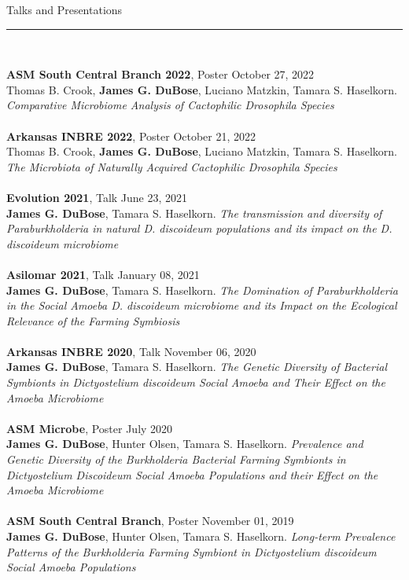\documentclass{article}
\begin{document}
\begin{flushleft}
{\Large Talks and Presentations} \rule{16.51cm}{0.4pt}\\
\end{flushleft}
\textbf{ASM South Central Branch 2022}, Poster \hfill October 27, 2022\\
Thomas B. Crook, \textbf{James G. DuBose}, Luciano Matzkin, Tamara S. Haselkorn. \emph{Comparative Microbiome Analysis of Cactophilic Drosophila Species}\\
\\
\textbf{Arkansas INBRE 2022}, Poster \hfill October 21, 2022\\
Thomas B. Crook, \textbf{James G. DuBose}, Luciano Matzkin, Tamara S. Haselkorn. \emph{The Microbiota of Naturally Acquired Cactophilic Drosophila Species}\\
\\
\textbf{Evolution 2021}, Talk \hfill June 23, 2021\\
\textbf{James G. DuBose}, Tamara S. Haselkorn. \emph{The transmission and diversity of Paraburkholderia in natural D. discoideum populations and its impact on the D. discoideum microbiome}\\
\\
\textbf{Asilomar 2021}, Talk \hfill January 08, 2021\\
\textbf{James G. DuBose}, Tamara S. Haselkorn. \emph{The Domination of Paraburkholderia in the Social Amoeba D. discoideum microbiome and its Impact on the Ecological Relevance of the Farming Symbiosis}\\
\\
\textbf{Arkansas INBRE 2020}, Talk \hfill November 06, 2020\\
\textbf{James G. DuBose}, Tamara S. Haselkorn. \emph{The Genetic Diversity of Bacterial Symbionts in Dictyostelium discoideum Social Amoeba and Their Effect on the Amoeba Microbiome}\\
\\
\textbf{ASM Microbe}, Poster \hfill July 2020\\
\textbf{James G. DuBose}, Hunter Olsen, Tamara S. Haselkorn. \emph{Prevalence and Genetic Diversity
of the Burkholderia Bacterial Farming Symbionts in Dictyostelium Discoideum Social Amoeba Populations and their Effect on the Amoeba Microbiome}\\
\\
\textbf{ASM South Central Branch}, Poster \hfill November 01, 2019\\
\textbf{James G. DuBose}, Hunter Olsen, Tamara S. Haselkorn. \emph{Long-term Prevalence Patterns of the Burkholderia Farming Symbiont in Dictyostelium discoideum Social Amoeba Populations}
\end{document}
